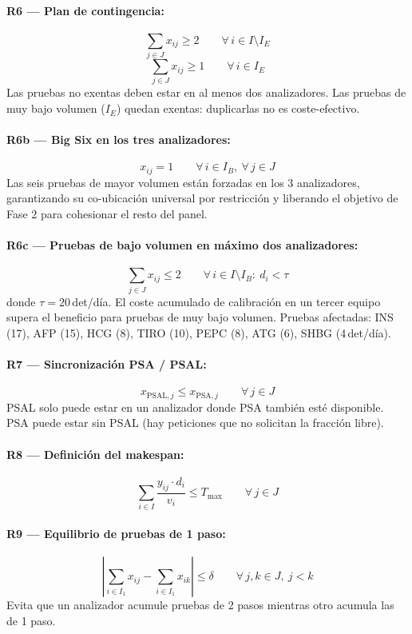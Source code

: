 \documentclass[12pt, a4paper]{article}
\begin{document}
\paragraph{R6 — Plan de contingencia:}
\[
  \sum_{j \in J} x_{ij} \geq 2 \qquad \forall\, i \in I \setminus I_E
\]
\[
  \sum_{j \in J} x_{ij} \geq 1 \qquad \forall\, i \in I_E
\]
Las pruebas no exentas deben estar en al menos dos analizadores. Las pruebas de muy bajo
volumen ($I_E$) quedan exentas: duplicarlas no es coste-efectivo.

\paragraph{R6b — Big Six en los tres analizadores:}
\[
  x_{ij} = 1 \qquad \forall\, i \in I_B,\ \forall\, j \in J
\]
Las seis pruebas de mayor volumen están forzadas en los 3 analizadores, garantizando su
co-ubicación universal por restricción y liberando el objetivo de Fase 2 para cohesionar
el resto del panel.

\paragraph{R6c — Pruebas de bajo volumen en máximo dos analizadores:}
\[
  \sum_{j \in J} x_{ij} \leq 2 \qquad \forall\, i \in I \setminus I_B :\ d_i < \tau
\]
donde $\tau = 20$\,det/día. El coste acumulado de calibración en un tercer equipo supera el
beneficio para pruebas de muy bajo volumen. Pruebas afectadas: INS (17), AFP (15),
HCG (8), TIRO (10), PEPC (8), ATG (6), SHBG (4\,det/día).

\paragraph{R7 — Sincronización PSA / PSAL:}
\[
  x_{\text{PSAL},j} \leq x_{\text{PSA},j} \qquad \forall\, j \in J
\]
PSAL solo puede estar en un analizador donde PSA también esté disponible. PSA puede estar
sin PSAL (hay peticiones que no solicitan la fracción libre).

\paragraph{R8 — Definición del makespan:}
\[
  \sum_{i \in I} \frac{y_{ij} \cdot d_i}{v_i} \leq T_{\max} \qquad \forall\, j \in J
\]

\paragraph{R9 — Equilibrio de pruebas de 1 paso:}
\[
  \left|\sum_{i \in I_1} x_{ij} - \sum_{i \in I_1} x_{ik}\right| \leq \delta
  \qquad \forall\, j,k \in J,\ j < k
\]
Evita que un analizador acumule pruebas de 2 pasos mientras otro acumula las de 1 paso.
\end{document}
